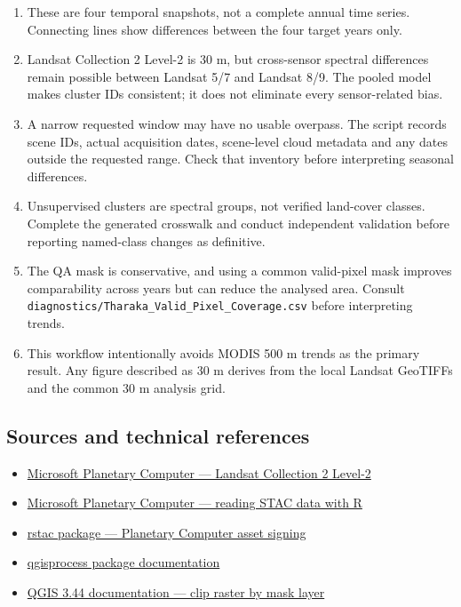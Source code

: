 \documentclass[
]{article}
\providecommand{\tightlist}{%
  \setlength{\itemsep}{0pt}\setlength{\parskip}{0pt}}
\begin{document}
\begin{enumerate}
\def\labelenumi{\arabic{enumi}.}
\tightlist
\item
  These are four temporal snapshots, not a complete annual time series.
  Connecting lines show differences between the four target years only.
\item
  Landsat Collection 2 Level-2 is 30 m, but cross-sensor spectral
  differences remain possible between Landsat 5/7 and Landsat 8/9. The
  pooled model makes cluster IDs consistent; it does not eliminate every
  sensor-related bias.
\item
  A narrow requested window may have no usable overpass. The script
  records scene IDs, actual acquisition dates, scene-level cloud
  metadata and any dates outside the requested range. Check that
  inventory before interpreting seasonal differences.
\item
  Unsupervised clusters are spectral groups, not verified land-cover
  classes. Complete the generated crosswalk and conduct independent
  validation before reporting named-class changes as definitive.
\item
  The QA mask is conservative, and using a common valid-pixel mask
  improves comparability across years but can reduce the analysed area.
  Consult \texttt{diagnostics/Tharaka\_Valid\_Pixel\_Coverage.csv}
  before interpreting trends.
\item
  This workflow intentionally avoids MODIS 500 m trends as the primary
  result. Any figure described as 30 m derives from the local Landsat
  GeoTIFFs and the common 30 m analysis grid.
\end{enumerate}

\subsection{Sources and technical
references}\label{sources-and-technical-references}

\begin{itemize}
\tightlist
\item
  \href{https://planetarycomputer.microsoft.com/dataset/landsat-c2-l2}{Microsoft
  Planetary Computer --- Landsat Collection 2 Level-2}
\item
  \href{https://planetarycomputer.microsoft.com/docs/quickstarts/reading-stac-r/}{Microsoft
  Planetary Computer --- reading STAC data with R}
\item
  \href{https://brazil-data-cube.github.io/rstac/reference/items_sign_planetary_computer.html}{rstac
  package --- Planetary Computer asset signing}
\item
  \href{https://r-spatial.github.io/qgisprocess/}{qgisprocess package
  documentation}
\item
  \href{https://doc.qgis.org/3.44/en/docs/user_manual/processing_algs/gdal/rasterextraction.html}{QGIS
  3.44 documentation --- clip raster by mask layer}
\end{itemize}
\end{document}
